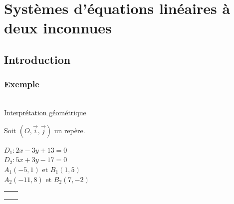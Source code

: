 \vspace*{-2.5cm}

\section{Systèmes d'équations linéaires à deux inconnues}

\subsection{Introduction}

\subsubsection{Exemple }

\\

\underline{Interprétation géométrique}

Soit $(O, \vec{i}, \vec{j})$ un repère. 

$D_1 : 2x -3y +13 = 0$\\

$D_2 : 5x +3y -17 = 0$\\

$A_1 (-5, 1) \textrm { et } B_1(1,5)$ \\

$A_2 (-11, 8) \textrm { et } B_2(7,-2)$ \\

\begin{tabular}{ll}
\begin{minipage}{5cm}
$D_1$ :  \raisebox{-2ex}{$\quad \begin{cases}
               3y \!\!\!\!\!\!\!\!&= -2x +13\\
                \;\;y\!\!\!\!\!\!\!\!&= \dfrac{2x}{3} +\dfrac{13}{3}\\
                        \end{cases}$ }\\
\end{minipage}  & 
                   \begin{minipage}{5cm}
                  $D_2$ :   \raisebox{-2ex}{$\quad \begin{cases}
                                           9y \!\!\!\!\!\!\!\!&= -5x +17\\
                                            \;\;y\!\!\!\!\!\!\!\!&= \dfrac{-5}{9}x +\dfrac{17}{9}\\
                        \end{cases}$ }\\
\end{minipage}\\
\end{tabular}\\

